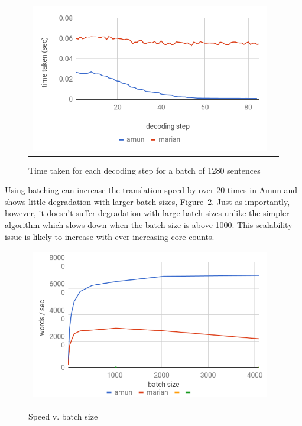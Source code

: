\documentclass[11pt,a4paper]{article}
\begin{document}
\begin{figure}
\centering
\begin{tabular}{cc}
{\includegraphics[scale=0.3]{decode-step.png}} 
\end{tabular}
\caption{Time taken for each decoding step for a batch of 1280 sentences}
\label{fig:decode-step}
\end{figure} 

Using batching can increase the translation speed by over 20 times in Amun and shows little degradation with larger batch sizes, Figure~\ref{fig:batch-size}. Just as importantly, however, it doesn't suffer degradation with large batch sizes unlike the simpler algorithm which slows down when the batch size is above 1000. This scalability issue is likely to increase with ever increasing core counts.


\begin{figure}
\centering
\begin{tabular}{cc}
{\includegraphics[scale=0.3]{batch-size.png}} 
\end{tabular}
\caption{Speed v. batch size}
\label{fig:batch-size}
\end{figure} 
\end{document}
